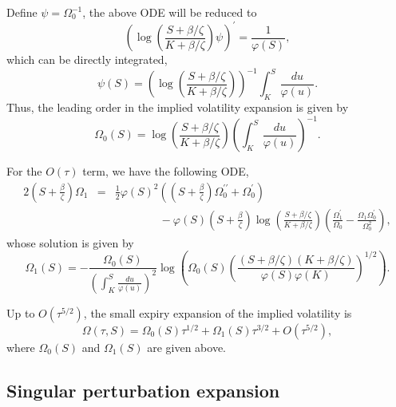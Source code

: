 \documentclass[12pt]{article}
\begin{document}
    Define $\psi=\Omega_0^{-1}$, the above ODE will be reduced to
    \begin{equation}
      \left(\log\left(\frac{S+\beta / \zeta}{K+\beta / \zeta}\right)\psi\right)^{\prime} = \frac{1}{\varphi(S)},
    \end{equation}
    which can be directly integrated,
    \begin{equation}
      \psi(S) = \left(\log\left(\frac{S+\beta / \zeta}{K+\beta / \zeta}\right)\right)^{-1}\int_K^S\frac{du}{\varphi(u)}.
    \end{equation}
    Thus, the leading order in the implied volatility expansion is given by
    \begin{equation}
      \Omega_0(S) = \log\left(\frac{S+\beta / \zeta}{K+\beta / \zeta}\right)\left(\int_K^S\frac{du}{\varphi(u)}\right)^{-1}.
    \end{equation}

    For the $O(\tau)$ term, we have the following ODE,
    \begin{eqnarray}
      2\left(S+\frac{\beta}{\zeta}\right)\Omega_1 &=&
      \frac{1}{2}\varphi(S)^2\left(\left(S+\frac{\beta}{\zeta}\right)\Omega_0^{\prime\prime}+\Omega_0^{\prime}\right) \nonumber\\
      &&\quad\quad\quad\quad - \varphi(S)\left(S+\frac{\beta}{\zeta}\right)\log\left(\frac{S+\beta / \zeta}{K+\beta / \zeta}\right)
                       \left(\frac{\Omega_1^{\prime}}{\Omega_0}-\frac{\Omega_1\Omega_0^{\prime}}{\Omega_0^2}\right),
    \end{eqnarray}
    whose solution is given by
    \begin{equation}
      \Omega_1(S) = -\frac{\Omega_0(S)}{\left(\int_K^S\frac{du}{\varphi(u)}\right)^2}\log\left(\Omega_0(S)
                    \left(\frac{(S+\beta / \zeta)(K+\beta / \zeta)}{\varphi(S)\varphi(K)}\right)^{1/2}\right).
    \end{equation}

    Up to $O\left(\tau^{5/2}\right)$, the small expiry expansion of the implied volatility is
    \begin{equation}
      \Omega(\tau,S)=\Omega_0(S)\tau^{1/2}+\Omega_1(S)\tau^{3/2}+O\left(\tau^{5/2}\right),
    \end{equation}
    where $\Omega_0(S)$ and $\Omega_1(S)$ are given above.




  \subsection{Singular perturbation expansion}
\end{document}
